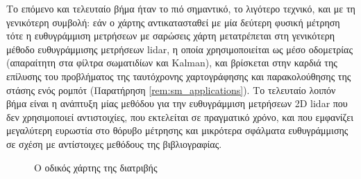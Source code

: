 Το επόμενο και τελευταίο βήμα ήταν το πιό σημαντικό, το λιγότερο τεχνικό, και
με τη γενικότερη συμβολή: εάν ο χάρτης αντικατασταθεί με μία δεύτερη φυσική
μέτρηση τότε η ευθυγράμμιση μετρήσεων με σαρώσεις χάρτη μετατρέπεται στη
γενικότερη μέθοδο ευθυγράμμισης μετρήσεων lidar, η οποία χρησιμοποιείται
ως μέσο οδομετρίας (απαραίτητη στα φίλτρα σωματιδίων και Kalman), και βρίσκεται
στην καρδιά της επίλυσης του προβλήματος της ταυτόχρονης χαρτογράφησης και
παρακολούθησης της στάσης ενός ρομπότ (Παρατήρηση \ref{rem:sm_applications}).
Το τελευταίο λοιπόν βήμα είναι η ανάπτυξη μίας μεθόδου για την ευθυγράμμιση
μετρήσεων 2D lidar που δεν χρησιμοποιεί αντιστοιχίες, που εκτελείται σε
πραγματικό χρόνο, και που εμφανίζει μεγαλύτερη ευρωστία στο θόρυβο μέτρησης
και μικρότερα σφάλματα ευθυγράμμισης σε σχέση με αντίστοιχες μεθόδους της
βιβλιογραφίας.

\begin{figure}\hspace{-2cm}
  
  \caption{\small Ο οδικός χάρτης της διατριβής}
  \label{fig:roadmap}
\end{figure}
